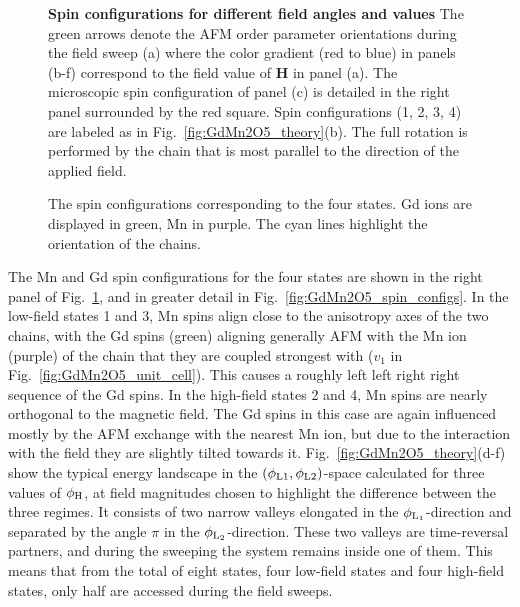 \newpage
\begin{figure}[h]
	\caption{{\bf Spin configurations for different field angles and values} The green arrows denote the AFM order parameter orientations during the field sweep (a) where the color gradient (red to blue) in panels (b-f) correspond to the field value of $\mathbf{H}$ in panel (a). The microscopic spin configuration of panel (c) is detailed in the right panel surrounded by the red square. Spin configurations (1, 2, 3, 4) are labeled as in Fig.~\ref{fig:GdMn2O5_theory}(b). The full rotation is performed by the chain that is most parallel to the direction of the applied field.\label{fig:GdMn2O5_regimes}}  
\end{figure}
\begin{figure}[b!]
    \centering
    \caption{\label{fig:GdMn2O5_spin_configs} The spin configurations corresponding to the four states. Gd ions are displayed in green, Mn in purple. The cyan lines highlight the orientation of the chains. }
    \label{fig:my_label}
\end{figure}
\newpage
The Mn and Gd spin configurations for the four states are shown in the right panel of Fig.~\ref{fig:GdMn2O5_regimes}, and in greater detail in Fig.~\ref{fig:GdMn2O5_spin_configs}. 
%
In the low-field states 1 and 3, Mn spins align close to the anisotropy axes of the two chains, with the Gd spins (green) aligning generally AFM with the Mn ion (purple) of the chain that they are coupled strongest with ($v_1$ in Fig.~\ref{fig:GdMn2O5_unit_cell}). This causes a roughly left left right right sequence of the Gd spins. 
% 
In the high-field states 2 and 4, Mn spins are nearly orthogonal to the magnetic field. The Gd spins in this case are again influenced mostly by the AFM exchange with the nearest Mn ion, but due to the interaction with the field they are slightly tilted towards it. 
%
Fig.~\ref{fig:GdMn2O5_theory}(d-f) show the typical energy landscape in the $(\phi_{\rm L1},\phi_{\rm L2})$-space calculated for three values of $\phi_{\rm H}$, at field magnitudes chosen to highlight the difference between the three regimes.
%
It consists of two narrow valleys elongated in the $\phi_{\rm L_1}$-direction and separated by the angle $\pi$ in the $\phi_{\rm L_2}$-direction.
These two valleys are time-reversal partners, and during the sweeping the system remains inside one of them. 
This means that from the total of eight states, four low-field states and four high-field states, only half are accessed during the field sweeps. 

